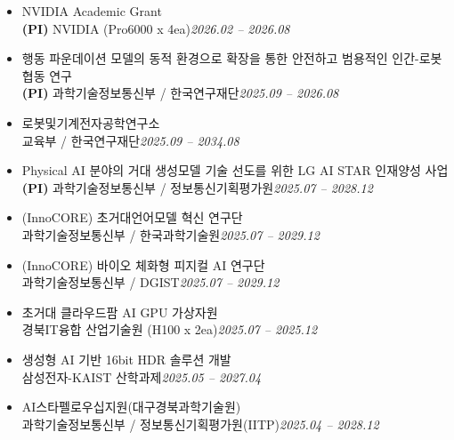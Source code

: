 \documentclass[a4paper,11pt]{article}
\begin{document}
\begin{itemize}[leftmargin=0.25cm]
    \item NVIDIA Academic Grant\\
    \textbf{(PI)} NVIDIA (Pro6000 x 4ea)\hfill \textit{2026.02 -- 2026.08}

    \item 행동 파운데이션 모델의 동적 환경으로 확장을 통한 안전하고 범용적인 인간-로봇 협동 연구\\
    \textbf{(PI)} 과학기술정보통신부 / 한국연구재단\hfill \textit{2025.09 -- 2026.08}

    \item 로봇및기계전자공학연구소\\
    교육부 / 한국연구재단\hfill \textit{2025.09 -- 2034.08}

    \item Physical AI 분야의 거대 생성모델 기술 선도를 위한 LG AI STAR 인재양성 사업\\
    \textbf{(PI)} 과학기술정보통신부 / 정보통신기획평가원\hfill \textit{2025.07 -- 2028.12}

    \item (InnoCORE) 초거대언어모델 혁신 연구단 \\
    과학기술정보통신부 / 한국과학기술원\hfill \textit{2025.07 -- 2029.12}

    \item (InnoCORE) 바이오 체화형 피지컬 AI 연구단 \\
    과학기술정보통신부 / DGIST\hfill \textit{2025.07 -- 2029.12}

    \item 초거대 클라우드팜 AI GPU 가상자원\\
    경북IT융합 산업기술원 (H100 x 2ea)\hfill \textit{2025.07 -- 2025.12}

    \item 생성형 AI 기반 16bit HDR 솔루션 개발\\
    삼성전자-KAIST 산학과제\hfill \textit{2025.05 -- 2027.04}

    \item AI스타펠로우십지원(대구경북과학기술원)\\
    과학기술정보통신부 / 정보통신기획평가원(IITP)\hfill \textit{2025.04 -- 2028.12}

\end{itemize}

\end{document}

